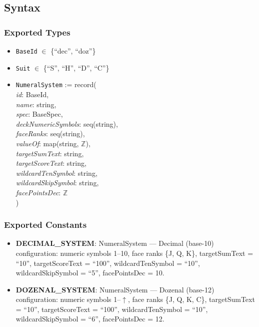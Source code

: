 \documentclass[12pt, titlepage]{article}
\begin{document}
\subsection{Syntax}

\subsubsection{Exported Types}
\begin{itemize}
    \item \texttt{BaseId} $\in$ \{``dec'', ``doz''\}
    \item \texttt{Suit} $\in$ \{``S'', ``H'', ``D'', ``C''\}
    \item \texttt{NumeralSystem} := record(\\
    \quad \textit{id}: BaseId,\\
    \quad \textit{name}: string,\\
    \quad \textit{spec}: BaseSpec,\\
    \quad \textit{deckNumericSymbols}: seq(string),\\
    \quad \textit{faceRanks}: seq(string),\\
    \quad \textit{valueOf}: map(string, $\mathbb{Z}$),\\
    \quad \textit{targetSumText}: string,\\
    \quad \textit{targetScoreText}: string,\\
    \quad \textit{wildcardTenSymbol}: string,\\
    \quad \textit{wildcardSkipSymbol}: string,\\
    \quad \textit{facePointsDec}: $\mathbb{Z}$\\
    )
\end{itemize}

\subsubsection{Exported Constants}
\begin{itemize}
    \item \textbf{DECIMAL\_SYSTEM}: NumeralSystem --- Decimal (base-10) configuration: numeric symbols 1--10, face ranks \{J, Q, K\}, targetSumText = ``10'', targetScoreText = ``100'', wildcardTenSymbol = ``10'', wildcardSkipSymbol = ``5'', facePointsDec = 10.
    \item \textbf{DOZENAL\_SYSTEM}: NumeralSystem --- Dozenal (base-12) configuration: numeric symbols 1--$\uparrow$, face ranks \{J, Q, K, C\}, targetSumText = ``10'', targetScoreText = ``100'', wildcardTenSymbol = ``10'', wildcardSkipSymbol = ``6'', facePointsDec = 12.
\end{itemize}
\end{document}
